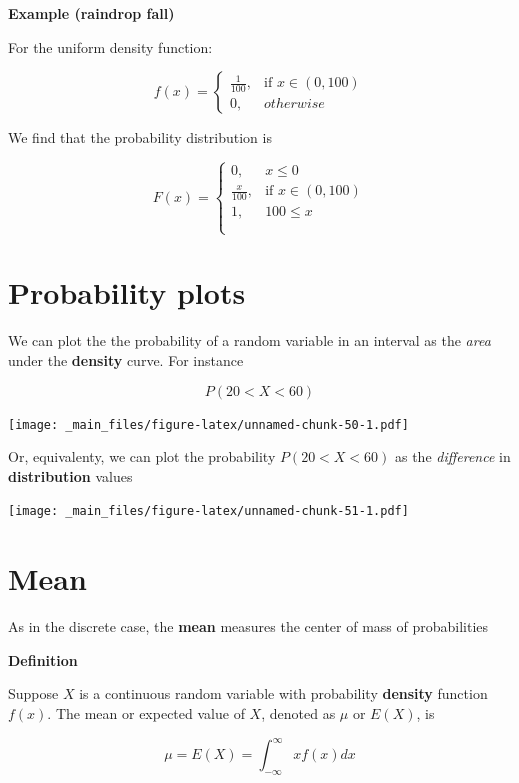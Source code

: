 \documentclass[
]{book}
\begin{document}
\textbf{Example (raindrop fall)}

For the uniform density function:

\[
    f(x)= 
\begin{cases}
    \frac{1}{100},& \text{if } x\in (0,100)\\
    0,& otherwise 
\end{cases}
\]

We find that the probability distribution is

\[
    F(x)= 
\begin{cases}
    0,& x \leq 0 \\
    \frac{x}{100},& \text{if } x\in (0,100)\\
    1, & 100 \leq x \\
    \\
\end{cases}
\]

\newpage

\hypertarget{probability-plots}{%
\section{Probability plots}\label{probability-plots}}

We can plot the the probability of a random variable in an interval as the \emph{area} under the \textbf{density} curve. For instance

\[P(20<X<60)\]

\texttt{[image: \_main\_files/figure-latex/unnamed-chunk-50-1.pdf]}

Or, equivalenty, we can plot the probability \(P(20<X<60)\) as the \emph{difference} in \textbf{distribution} values

\texttt{[image: \_main\_files/figure-latex/unnamed-chunk-51-1.pdf]}

\hypertarget{mean}{%
\section{Mean}\label{mean}}

As in the discrete case, the \textbf{mean} measures the center of mass of probabilities

\textbf{Definition}

Suppose \(X\) is a continuous random variable with probability \textbf{density} function \(f(x)\). The mean or expected value of \(X\), denoted as \(\mu\) or \(E(X)\), is

\[\mu=E(X)=\int_{-\infty}^\infty x f(x) dx\]
\end{document}
